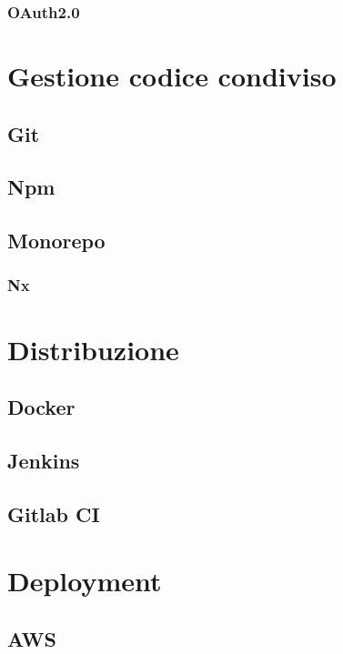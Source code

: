 \subsubsection{OAuth2.0}


\section{Gestione codice condiviso}
\subsection{Git}

\subsection{Npm}

\subsection{Monorepo}

\subsubsection{Nx}


\section{Distribuzione}
\subsection{Docker}

\subsection{Jenkins}

\subsection{Gitlab CI}


\section{Deployment}
\subsection{AWS}

